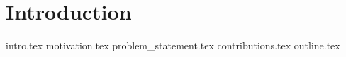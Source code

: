 \chapter{Introduction}
\label{ch:1}
{intro.tex}
{motivation.tex}
{problem_statement.tex}
{contributions.tex}
{outline.tex}
